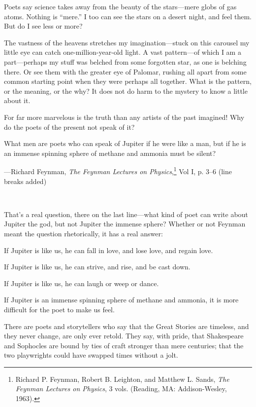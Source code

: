 {
 Poets say science takes away from the beauty of the stars---mere
globs of gas atoms. Nothing is
``mere.'' I too can see the stars on
a desert night, and feel them. But do I see less or more?}

{
 The vastness of the heavens stretches my imagination---stuck on
this carousel my little eye can catch one-million-year-old light. A
vast pattern---of which I am a part---perhaps my stuff was belched from
some forgotten star, as one is belching there. Or see them with the
greater eye of Palomar, rushing all apart from some common starting
point when they were perhaps all together. What is the pattern, or the
meaning, or the why? It does not do harm to the mystery to know a
little about it.}

{
 For far more marvelous is the truth than any artists of the past
imagined! Why do the poets of the present not speak of it?}

{
 What men are poets who can speak of Jupiter if he were like a man,
but if he is an immense spinning sphere of methane and ammonia must be
silent?}

{\raggedleft
 {}---Richard Feynman, \textit{The Feynman Lectures on
Physics},\footnote{Richard P. Feynman, Robert B. Leighton, and Matthew L. Sands,
\textit{The Feynman Lectures on Physics}, 3 vols. (Reading, MA:
Addison-Wesley, 1963).}\newline
 Vol I, p. 3--6 (line breaks added)
\par}


\bigskip

{
 ~}

{
 That's a real question, there on the last
line---what kind of poet can write about Jupiter the god, but not
Jupiter the immense sphere? Whether or not Feynman meant the question
rhetorically, it has a real answer:}

{
 If Jupiter is like us, he can fall in love, and lose love, and
regain love.}

{
 If Jupiter is like us, he can strive, and rise, and be cast down.}

{
 If Jupiter is like us, he can laugh or weep or dance.}

{
 If Jupiter is an immense spinning sphere of methane and ammonia,
it is more difficult for the poet to make us feel.}

{
 There are poets and storytellers who say that the Great Stories
are timeless, and they never change, are only ever retold. They say,
with pride, that Shakespeare and Sophocles are bound by ties of craft
stronger than mere centuries; that the two playwrights could have
swapped times without a jolt.}


